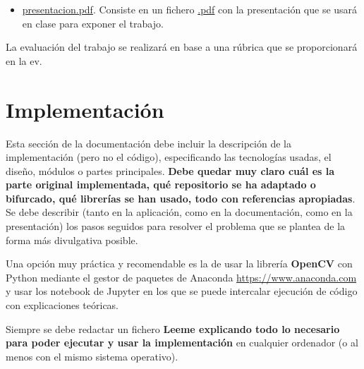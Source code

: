 \documentclass[a4paper]{article}
\begin{document}
\begin{itemize}
En caso de que exista ya una implementación en un repositorio público asociado al trabajo escogido, se debe desarrollar una versión propia, haciendo una bifurcación (fork) del repositorio que incluya explicaciones, paso a paso, ejemplos, modificaciones, etc. Por ejemplo, se puede hacer un notebook de jupyter que incluya ejemplos de uso o la experimentación.
Aquí el archivo {\bf Readme} deberá referenciar bien el trabajo original y explicar la aportación propia.


\item \url{presentacion.pdf}. Consiste en un fichero \url{.pdf} con la presentación que se usará en clase para exponer el trabajo.
\end{itemize}

La evaluación del trabajo se realizará en base a una rúbrica que se proporcionará en la ev. 




\section{Implementación}

Esta sección de la documentación  debe incluir la descripción de la implementación (pero no el código), especificando las tecnologías usadas, el diseño, módulos o partes principales. \textbf{Debe quedar muy claro cuál es la parte original implementada, qué repositorio se ha adaptado o bifurcado, qué librerías se han usado,  todo con referencias apropiadas}. Se debe describir (tanto en la aplicación, como en la documentación, como en la presentación) los pasos seguidos para resolver el problema que se plantea de la forma más divulgativa posible. 

Una opción muy práctica y recomendable es la de usar la librería \textbf{OpenCV} con Python mediante el gestor de paquetes de Anaconda \url{https://www.anaconda.com} y usar los notebook de Jupyter en los que se puede intercalar ejecución de código con explicaciones teóricas. %

Siempre se debe redactar un fichero {\bf Leeme explicando todo lo necesario para poder ejecutar y usar la implementación} en cualquier ordenador (o al menos con el mismo sistema operativo).
\end{document}
